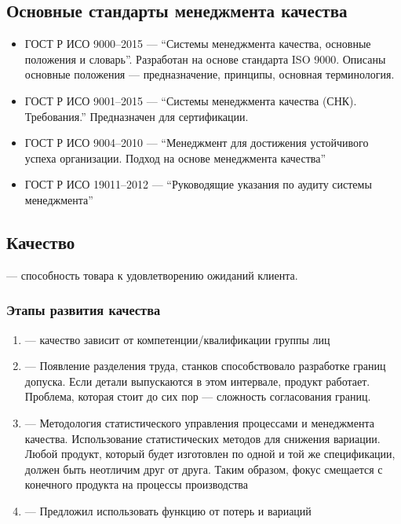 \documentclass[a4paper, 14pt]{extarticle}
\begin{document}
\subsection{Основные стандарты менеджмента качества}
\begin{itemize}
    \item ГОСТ Р ИСО 9000–2015 --- ``Системы менеджмента качества, основные положения и словарь''. Разработан на основе стандарта ISO 9000. Описаны основные положения --- предназначение, принципы, основная терминология.
    \item ГОСТ Р ИСО 9001–2015 --- ``Системы менеджмента качества (СНК). Требования.'' Предназначен для сертификации.
    \item  ГОСТ Р ИСО 9004–2010 --- ``Менеджмент для достижения устойчивого успеха организации. Подход на основе менеджмента качества''
    \item  ГОСТ Р ИСО 19011–2012 --- ``Руководящие указания по аудиту системы менеджмента''
\end{itemize}

\subsection{Качество}
 --- способность товара к удовлетворению ожиданий клиента.

\subsubsection*{Этапы развития качества}
\begin{enumerate}
    \item {} --- качество зависит от компетенции/квалификации группы лиц
    \item {} --- Появление разделения труда, станков способствовало разработке границ допуска. Если детали выпускаются в этом интервале, продукт работает.\\
    Проблема, которая стоит до сих пор — сложность согласования границ.
    \item {} --- Методология статистического управления процессами и менеджмента качества. Использование статистических методов для снижения вариации.\\
    Любой продукт, который будет изготовлен по одной и той же спецификации, должен быть неотличим друг от друга. Таким образом, фокус смещается с конечного продукта на процессы производства
    \item {} --- Предложил использовать функцию от потерь и вариаций
\end{enumerate}
\end{document}

